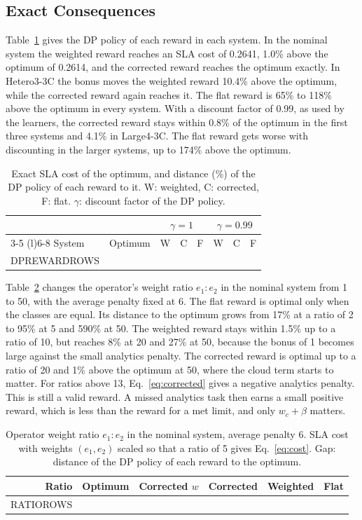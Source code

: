 \subsection{Exact Consequences}
Table~\ref{tab:dprewards} gives the DP policy of each reward in each system. In the nominal system the weighted reward reaches an SLA cost of 0.2641, 1.0\% above the optimum of 0.2614, and the corrected reward reaches the optimum exactly. In Hetero3-3C the bonus moves the weighted reward 10.4\% above the optimum, while the corrected reward again reaches it. The flat reward is 65\% to 118\% above the optimum in every system. With a discount factor of 0.99, as used by the learners, the corrected reward stays within 0.8\% of the optimum in the first three systems and 4.1\% in Large4-3C. The flat reward gets worse with discounting in the larger systems, up to 174\% above the optimum.

\begin{table}[t]
\caption{Exact SLA cost of the optimum, and distance (\%) of the DP policy of each reward to it. W: weighted, C: corrected, F: flat. $\gamma$: discount factor of the DP policy.}
\label{tab:dprewards}
\centering
\footnotesize
\setlength{\tabcolsep}{2.6pt}
\begin{tabular}{@{}lccccccc@{}}
\toprule
 & & \multicolumn{3}{c}{$\gamma = 1$} & \multicolumn{3}{c}{$\gamma = 0.99$} \\
\cmidrule(lr){3-5} \cmidrule(l){6-8}
System & Optimum & W & C & F & W & C & F \\
\midrule
DPREWARDROWS
\bottomrule
\end{tabular}
\end{table}

Table~\ref{tab:ratios} changes the operator's weight ratio $e_1 : e_2$ in the nominal system from 1 to 50, with the average penalty fixed at 6. The flat reward is optimal only when the classes are equal. Its distance to the optimum grows from 17\% at a ratio of 2 to 95\% at 5 and 590\% at 50. The weighted reward stays within 1.5\% up to a ratio of 10, but reaches 8\% at 20 and 27\% at 50, because the bonus of 1 becomes large against the small analytics penalty. The corrected reward is optimal up to a ratio of 20 and 1\% above the optimum at 50, where the cloud term starts to matter. For ratios above 13, Eq.~\eqref{eq:corrected} gives a negative analytics penalty. This is still a valid reward. A missed analytics task then earns a small positive reward, which is less than the reward for a met limit, and only $w_c + \beta$ matters.

\begin{table}[t]
\caption{Operator weight ratio $e_1 : e_2$ in the nominal system, average penalty 6. SLA cost with weights $(e_1, e_2)$ scaled so that a ratio of 5 gives Eq.~\eqref{eq:cost}. Gap: distance of the DP policy of each reward to the optimum.}
\label{tab:ratios}
\centering
\footnotesize
\setlength{\tabcolsep}{2.5pt}
\begin{tabular}{@{}rccccc@{}}
\toprule
Ratio & Optimum & Corrected $w$ & Corrected & Weighted & Flat \\
\midrule
RATIOROWS
\bottomrule
\end{tabular}
\end{table}

